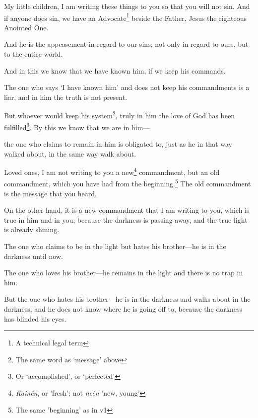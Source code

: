 \documentclass[article]{memoir}%
\newcounter{vnum}
\renewcommand*{\chapter}{
	\vspace{\baselineskip}
	\settowidth{\chapindent}{\chapnumfont 999}
	\noindent\llap{\makebox[\chapindent][l]{%
		\chapnumfont \thechapter}}%
	\addtocounter{chapter}{1}
	\setcounter{vnum}{1}
}
\newcommand{\vnum}{%
	\textsuperscript{\thevnum}%
	\addtocounter{vnum}{1}%
}
\newcommand{\focus}[1]{{#1}}
\begin{document}
\chapter {} \vnum My little children, I am writing these things to you so that you will not sin. And if anyone does sin, we have an Advocate\footnote{A technical legal term} beside the Father, Jesus the righteous Anointed One. \vnum And he is the appeasement in regard to our sins; not only in regard to ours, but to the entire world. \vnum And in this we know that we have known him, if we keep his commands. \vnum The one who says `I have known him' and does not keep his commandments is a liar, and in him the truth is not present. \vnum But whoever would keep his system\footnote{The same word as `message' above}, truly in him the love of God	 has been fulfilled\footnote{Or `accomplished', or `perfected'}. By this we know that we \focus{are} in him---\vnum{}the one who claims to remain in him is obligated to, just as he in that way walked about, in the same way walk about.

\vnum Loved ones, I am not writing to you a new\footnote{\textit{Kainén}, or 'fresh'; not \textit{neén} 'new, young'} commandment, but an old commandment, which you have had from the beginning.\footnote{The same 'beginning' as in v1} The old commandment is the message that you heard. \vnum On the other hand, it is a new commandment that I am writing to you, which is true in him and in you, because the darkness is passing away, and the true light is already shining. \vnum The one who claims to be in the light but hates his brother---he is in the darkness until now. \vnum The one who loves his brother---he remains in the light and there is no trap in him. \vnum But the one who hates his brother---he is in the darkness and walks about in the darkness; and he does not know where he is going off to, because the darkness has blinded his eyes.
\end{document}
